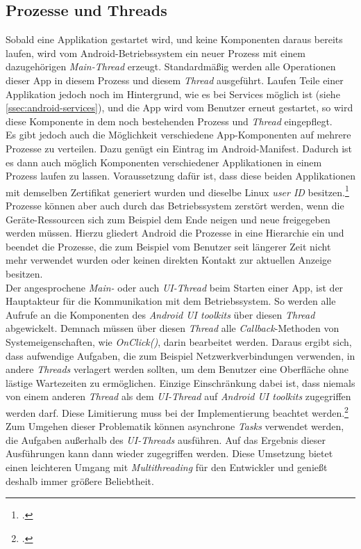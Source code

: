 \subsection{Prozesse und Threads}
\label{ssec:android-prozesse-threads}
Sobald eine Applikation gestartet wird, und keine Komponenten daraus bereits laufen, wird vom Android-Betriebssystem ein neuer Prozess mit einem dazugehörigen \textit{Main-Thread} erzeugt. Standardmäßig werden alle Operationen dieser App in diesem Prozess und diesem \textit{Thread} ausgeführt. Laufen Teile einer Applikation jedoch noch im Hintergrund, wie es bei Services möglich ist (siehe \ref{ssec:android-services}), und die App wird vom Benutzer erneut gestartet, so wird diese Komponente in dem noch bestehenden Prozess und \textit{Thread} eingepflegt.\\
Es gibt jedoch auch die Möglichkeit verschiedene App-Komponenten auf mehrere Prozesse zu verteilen. Dazu genügt ein Eintrag im Android-Manifest. Dadurch ist es dann auch möglich Komponenten verschiedener Applikationen in einem Prozess laufen zu lassen. Voraussetzung dafür ist, dass diese beiden Applikationen mit demselben Zertifikat generiert wurden und dieselbe Linux \textit{\ac{user ID}} besitzen.\footcite{Android-ProcessesThreads}\\
Prozesse können aber auch durch das Betriebssystem zerstört werden, wenn die Geräte-Ressourcen sich zum Beispiel dem Ende neigen und neue freigegeben werden müssen. Hierzu gliedert Android die Prozesse in eine Hierarchie ein und beendet die Prozesse, die zum Beispiel vom Benutzer seit längerer Zeit nicht mehr verwendet wurden oder keinen direkten Kontakt zur aktuellen Anzeige besitzen.\\
Der angesprochene \textit{Main-} oder auch \textit{\ac{UI-Thread}} beim Starten einer App, ist der Hauptakteur für die Kommunikation mit dem Betriebssystem. So werden alle Aufrufe an die Komponenten des \textit{Android UI toolkits} über diesen \textit{Thread} abgewickelt. Demnach müssen über diesen \textit{Thread} alle \textit{Callback}-Methoden von Systemeigenschaften, wie \textit{OnClick()}, darin bearbeitet werden. Daraus ergibt sich, dass aufwendige Aufgaben, die zum Beispiel Netzwerkverbindungen verwenden, in andere \textit{Threads} verlagert werden sollten, um dem Benutzer eine Oberfläche ohne lästige Wartezeiten zu ermöglichen. Einzige Einschränkung dabei ist, dass niemals von einem anderen \textit{Thread} als dem \textit{UI-Thread} auf \textit{\ac{Android UI toolkits}} zugegriffen werden darf. Diese Limitierung muss bei der Implementierung beachtet werden.\footcite[S. 160f.]{Android-BeckerPant}\\
Zum Umgehen dieser Problematik können asynchrone \textit{\ac{Tasks}} verwendet werden, die Aufgaben außerhalb des \textit{UI-Threads} ausführen. Auf das Ergebnis dieser Ausführungen kann dann wieder zugegriffen werden. Diese Umsetzung bietet einen leichteren Umgang mit \textit{Multithreading} für den Entwickler und genießt deshalb immer größere Beliebtheit.
